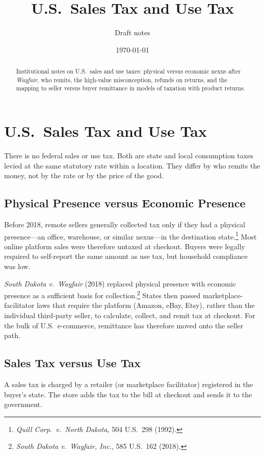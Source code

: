 \documentclass[11pt]{article}
\title{U.S.\ Sales Tax and Use Tax}
\author{Draft notes}
\date{\today}
\begin{document}
\maketitle

\begin{abstract}
Institutional notes on U.S.\ sales and use taxes: physical versus economic
nexus after \emph{Wayfair}, who remits, the high-value misconception, refunds
on returns, and the mapping to seller versus buyer remittance in models of
taxation with product returns.
\end{abstract}

\section{U.S.\ Sales Tax and Use Tax}

There is no federal sales or use tax.  Both are state and local consumption
taxes levied at the same statutory rate within a location.  They differ by who
remits the money, not by the rate or by the price of the good.

\subsection{Physical Presence versus Economic Presence}

Before 2018, remote sellers generally collected tax only if they had a physical
presence---an office, warehouse, or similar nexus---in the destination
state.\footnote{\emph{Quill Corp.\ v.\ North Dakota}, 504 U.S.\ 298 (1992).}
Most online platform sales were therefore untaxed at checkout.  Buyers were
legally required to self-report the same amount as use tax, but household
compliance was low.

\emph{South Dakota v.\ Wayfair} (2018) replaced physical presence with
economic presence as a sufficient basis for collection.\footnote{\emph{South
  Dakota v.\ Wayfair, Inc.}, 585 U.S.\ 162 (2018).}
States then passed marketplace-facilitator laws that require the platform
(Amazon, eBay, Etsy), rather than the individual third-party seller, to
calculate, collect, and remit tax at checkout.  For the bulk of U.S.\
e-commerce, remittance has therefore moved onto the seller path.

\subsection{Sales Tax versus Use Tax}

A sales tax is charged by a retailer (or marketplace facilitator) registered
in the buyer's state.  The store adds the tax to the bill at checkout and
sends it to the government.
\end{document}
